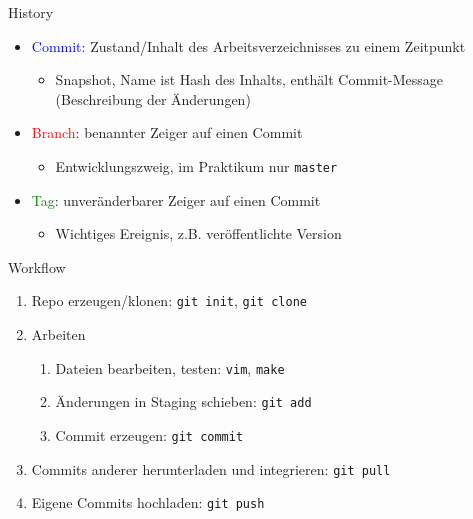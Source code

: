 \begin{frame}{History}

  \vspace{1em}
  \begin{itemize}
    \item \textcolor{blue}{Commit}: Zustand/Inhalt des Arbeitsverzeichnisses zu einem Zeitpunkt
      \begin{itemize}
        \item Snapshot, Name ist Hash des Inhalts, enthält Commit-Message (Beschreibung der Änderungen)
      \end{itemize}
    \item \textcolor{red}{Branch}: benannter Zeiger auf einen Commit
      \begin{itemize}
        \item Entwicklungszweig, im Praktikum nur \texttt{master}
      \end{itemize}
    \item \textcolor{green}{Tag}: unveränderbarer Zeiger auf einen Commit
      \begin{itemize}
        \item Wichtiges Ereignis, z.B. veröffentlichte Version
      \end{itemize}
  \end{itemize}
\end{frame}

\begin{frame}{Workflow}
  \begin{enumerate}
    \item Repo erzeugen/klonen: \texttt{git init}, \texttt{git clone}
    \item Arbeiten
      \begin{enumerate}
        \item Dateien bearbeiten, testen: \texttt{vim}, \texttt{make}
        \item Änderungen in Staging schieben: \texttt{git add}
        \item Commit erzeugen: \texttt{git commit}
      \end{enumerate}
    \item Commits anderer herunterladen und integrieren: \texttt{git pull}
    \item Eigene Commits hochladen: \texttt{git push}
  \end{enumerate}
\end{frame}

